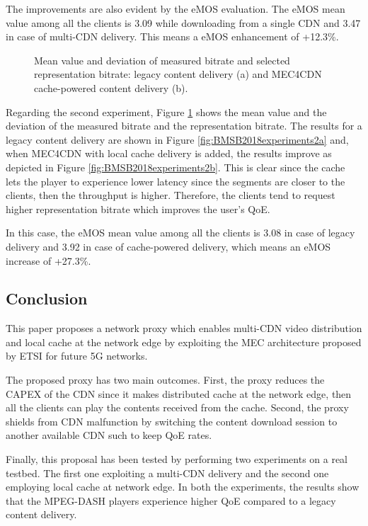 The improvements are also evident by the eMOS evaluation. The eMOS mean value among all the clients is 3.09 while downloading from a single CDN and 3.47 in case of multi-CDN delivery. This means a eMOS enhancement of +12.3\%.

\begin{figure}[htp]
	\centering
	\hfil
	\hfil
	\caption{Mean value and deviation of measured bitrate and selected representation bitrate: legacy content delivery (a) and MEC4CDN cache-powered content delivery (b).}
	\label{fig:BMSB2018experiments2}
\end{figure}

Regarding the second experiment, Figure \ref{fig:BMSB2018experiments2} shows the mean value and the deviation of the measured bitrate and the representation bitrate. The results for a legacy content delivery are shown in Figure \ref{fig:BMSB2018experiments2a} and, when MEC4CDN with local cache delivery is added, the results improve as depicted in Figure \ref{fig:BMSB2018experiments2b}. 
This is clear since the cache lets the player to experience lower latency since the segments are closer to the clients, then the throughput is higher. Therefore, the clients tend to request higher representation bitrate which improves the user's QoE. 

In this case, the eMOS mean value among all the clients is 3.08 in case of legacy delivery and 3.92 in case of cache-powered delivery, which means an eMOS increase of +27.3\%.


\subsection{Conclusion}
\label{sec:BMSB2018conclusion}
This paper proposes a network proxy which enables multi-CDN video distribution and local cache at the network edge by exploiting the MEC architecture proposed by ETSI for future 5G networks.

The proposed proxy has two main outcomes. First, the proxy reduces the CAPEX of the CDN since it makes distributed cache at the network edge, then all the clients can play the contents received from the cache. Second, the proxy shields from CDN malfunction by switching the content download session to another available CDN such to keep QoE rates.

Finally, this proposal has been tested by performing two experiments on a real testbed. The first one exploiting a multi-CDN delivery and the second one employing local cache at network edge. In both the experiments, the results show that the MPEG-DASH players experience higher QoE compared to a legacy content delivery.




		
